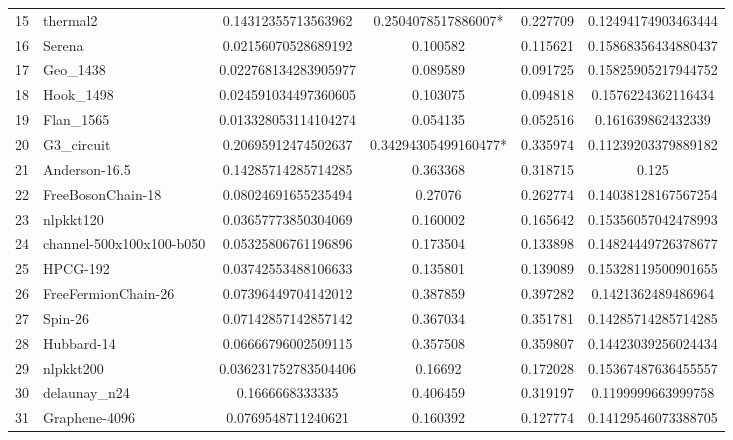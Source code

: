 \begin{tabular}{|l|l|S[round-mode=places,round-precision=4]|S[round-mode=places,round-precision=4]|S[round-mode=places,round-precision=4]|S[round-mode=places,round-precision=4]|}
{15}& {	thermal2                  }	& 0.14312355713563962	& 0.2504078517886007*	& 0.227709	& 0.12494174903463444	\\
{16}& {	Serena                    }	& 0.02156070528689192	& 0.100582	& 0.115621	& 0.15868356434880437	\\
{17}& {	Geo\_1438                  }	& 0.022768134283905977	& 0.089589	& 0.091725	& 0.15825905217944752	\\
{18}& {	Hook\_1498                 }	& 0.024591034497360605	& 0.103075	& 0.094818	& 0.1576224362116434	\\
{19}& {	Flan\_1565                 }	& 0.013328053114104274	& 0.054135	& 0.052516	& 0.161639862432339	\\
{20}& {	G3\_circuit                }	& 0.20695912474502637	& 0.34294305499160477*	& 0.335974	& 0.11239203379889182	\\
{21}& {	Anderson-16.5             }	& 0.14285714285714285	& 0.363368	& 0.318715	& 0.125	\\
{22}& {	FreeBosonChain-18         }	& 0.08024691655235494	& 0.27076	& 0.262774	& 0.14038128167567254	\\
{23}& {	nlpkkt120                 }	& 0.03657773850304069	& 0.160002	& 0.165642	& 0.15356057042478993	\\
{24}& {	channel-500x100x100-b050  }	& 0.05325806761196896	& 0.173504	& 0.133898	& 0.14824449726378677	\\
{25}& {	HPCG-192                  }	& 0.03742553488106633	& 0.135801	& 0.139089	& 0.15328119500901655	\\
{26}& {	FreeFermionChain-26       }	& 0.07396449704142012	& 0.387859	& 0.397282	& 0.1421362489486964	\\
{27}& {	Spin-26                   }	& 0.07142857142857142	& 0.367034	& 0.351781	& 0.14285714285714285	\\
{28}& {	Hubbard-14                }	& 0.06666796002509115	& 0.357508	& 0.359807	& 0.14423039256024434	\\
{29}& {	nlpkkt200                 }	& 0.036231752783504406	& 0.16692	& 0.172028	& 0.15367487636455557	\\
{30}& {	delaunay\_n24              }	& 0.1666668333335	& 0.406459	& 0.319197	& 0.1199999663999758	\\
{31}& {	Graphene-4096             }	& 0.0769548711240621	& 0.160392	& 0.127774	& 0.14129546073388705	\\
\bottomrule
\end{tabular}



